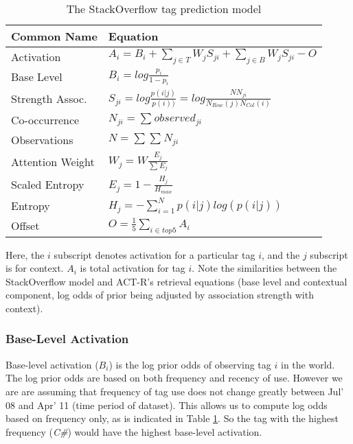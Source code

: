 \documentclass[10pt,letterpaper]{article}
\begin{document}
\renewcommand{\arraystretch}{1.5}
\renewcommand{\tabcolsep}{.5mm}
\begin{table}[!ht]
  \begin{center}
    \caption{The StackOverflow tag prediction model}
    \label{sample-table}
    \vskip 0.12in
    \begin{tabular}{ll}
      \hline
      Common Name &  Equation \\
      \hline
      Activation & 		$A_{i} = B_{i} + \sum_{j\in T}^{ } W_{j} S_{ji} + \sum_{j\in B}^{ } W_{j} S_{ji} - O$ \\
      Base Level & 		$B_{i} = log \frac{p_{i}}{1-p_{i}}$ \\
      Strength Assoc. &		$S_{ji} = log \frac{p(i|j)}{p(i))} = log \frac{NN_{ji}}{N_{Row}(j)N_{Col}(i)}$ \\
      Co-occurrence &		$N_{ji} = \sum_{}^{}{observed_{ji}}$ \\
      Observations &		$N = \sum_{}^{}{\sum_{}^{}{N_{ji}}}$ \\
      Attention Weight	& 	$W_{j} = W \frac{E_{j}} {\sum_{}^{} {E_{j}}} $ \\
      Scaled Entropy & 		$E_{j} = 1-\frac{H_{j}}{H_{max}}$ \\
      Entropy & 		$H_{j} = -\sum_{i=1}^{N}p(i|j)log\left (  p(i|j) \right )$ \\
      Offset & 			$O = \frac{1}{5}\sum_{i\in top 5}^{ } A_{i}$ \\
      \hline
    \end{tabular}
  \end{center}
\end{table}

Here, the $i$ subscript denotes activation for a particular tag $i$, and the $j$ subscript is for context.
$A_{i}$ is total activation for tag $i$.
Note the similarities between the StackOverflow model and ACT-R's retrieval equations (base level and contextual component, log odds of prior being adjusted by association strength with context).

\subsubsection{Base-Level Activation}

Base-level activation ($B_{i}$) is the log prior odds of observing tag $i$ in the world.
The log prior odds are based on both frequency and recency of use.
However we are are assuming that frequency of tag use does not change greatly between Jul' 08 and Apr' 11 (time period of dataset).
This allows us to compute log odds based on frequency only, as is indicated in Table \ref{sample-table}.
So the tag with the highest frequency (\emph{C\#}) would have the highest base-level activation.
\end{document}
